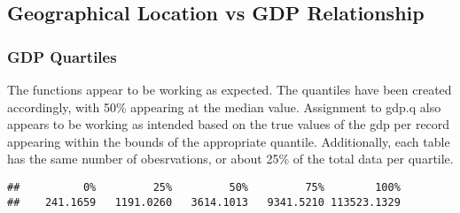 \documentclass[
]{article}
\begin{document}
\hypertarget{geographical-location-vs-gdp-relationship}{%
\subsection{Geographical Location vs GDP
Relationship}\label{geographical-location-vs-gdp-relationship}}

\hypertarget{gdp-quartiles}{%
\subsubsection{GDP Quartiles}\label{gdp-quartiles}}

The functions appear to be working as expected. The quantiles have been
created accordingly, with 50\% appearing at the median value. Assignment
to gdp.q also appears to be working as intended based on the true values
of the gdp per record appearing within the bounds of the appropriate
quantile. Additionally, each table has the same number of obesrvations,
or about 25\% of the total data per quartile.

\begin{verbatim}
##          0%         25%         50%         75%        100% 
##    241.1659   1191.0260   3614.1013   9341.5210 113523.1329
\end{verbatim}
\end{document}
